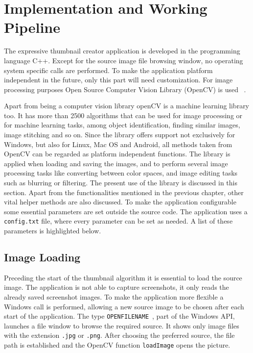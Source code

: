 \documentclass[draft,final]{vutinfth} %
\begin{document}
	\chapter{Implementation and Working Pipeline}
	\label{implementation}
	The expressive thumbnail creator application is developed in the programming language C++.
	Except for the source image file browsing window, no operating system specific calls are performed.
	To make the application platform independent in the future, only this part will need customization.
	For image processing purposes Open Source Computer Vision Library (OpenCV) is used ~\cite{opencv_library}.\par 
	Apart from being a computer vision library openCV is a machine learning library too.     
	It has more than 2500 algorithms that can be used for image processing or for machine learning tasks, among object identification, finding similar images, image stitching and so on.
	Since the library offers support not exclusively for Windows, but also for Linux, Mac OS and Android, all methods taken from OpenCV can be regarded as platform independent functions.
	The library is applied when loading and saving the images, and to perform several image processing tasks like converting between color spaces, and image editing tasks such as blurring or filtering.
	The present use of the library is discussed in this section.
	Apart from the functionalities mentioned in the previous chapter, other vital helper methods are also discussed.
	To make the application configurable some essential parameters are set outside the source code. 
	The application uses a \texttt{config.txt} file, where every parameter can be set as needed.
	A list of these parameters is highlighted below.\par
	
	\section{Image Loading}
	Preceding the start of the thumbnail algorithm it is essential to load the source image.
	The application is not able to capture screenshots, it only reads the already saved screenshot images.
	To make the application more flexible a Windows call is performed, allowing a new source image to be chosen after each start of the application.
	The type \texttt{OPENFILENAME}~\cite{openfilename}, part of the Windows API, launches a file window to browse the required source.
	It shows only image files with the extension \texttt{.jpg} or \texttt{.png}.
	After choosing the preferred source, the file path is established and the OpenCV function \texttt{loadImage} opens the picture.
	
\end{document}
